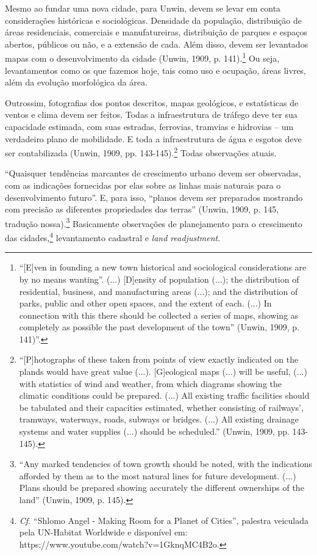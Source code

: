 \documentclass[12pt, a4paper]{book} %
\begin{document}
        Mesmo ao fundar uma nova cidade, para Unwin, devem se levar em conta considerações históricas e sociológicas. Densidade da população, distribuição de áreas residenciais, comerciais e manufatureiras, distribuição de parques e espaços abertos, públicos ou não, e a extensão de cada. Além disso, devem ser levantados mapas com o desenvolvimento da cidade (Unwin, 1909, p. 141).\footnote[29]{``[E]ven in founding a new town historical and sociological considerations are by no means wanting''. (...) [D]ensity of population (...); the distribution of residential, business, and manufacturing areas (...); and the distribution of parks, public and other open spaces, and the extent of each. (...) In connection with this there should be collected a series of maps, showing as completely as possible the past development of the town'' (Unwin, 1909, p. 141)''.} Ou seja, levantamentos como os que fazemos hoje, tais como uso e ocupação, áreas livres, além da evolução morfológica da área.

        Outrossim, fotografias dos pontos descritos, mapas geológicos, e estatísticas de ventos e clima devem ser feitos. Todas a infraestrutura de tráfego deve ter sua capacidade estimada, com suas estradas, ferrovias, tramvias e hidrovias – um verdadeiro plano de mobilidade. E toda a infraestrutura de água e esgotos deve ser contabilizada (Unwin, 1909, pp. 143-145).\footnote[30]{``[P]hotographs of these taken from points of view exactly indicated on the plands would have great value (...). [G]eological maps (...) will be useful, (...) with statistics of wind and weather, from which diagrams showing the climatic conditions could be prepared. (...) All existing traffic facilities should be tabulated and their capacities estimated, whether consisting of railways', tramways, waterways, roads, subways or bridges. (...) All existing drainage systems and water supplies (...) should be scheduled.'' (Unwin, 1909, pp. 143-145).} Todas observações atuais.

        ``Quaisquer tendências marcantes de crescimento urbano devem ser observadas, com as indicações fornecidas por elas sobre as linhas mais naturais para o desenvolvimento futuro''. E, para isso, ``planos devem ser preparados mostrando com precisão as diferentes propriedades das terras'' (Unwin, 1909, p. 145, tradução nossa).\footnote[31]{``Any marked tendencies of town growth should be noted, with the indications afforded by them as to the most natural lines for future development. (...) Plans should be prepared showing accurately the different ownerships of the land'' (Unwin, 1909, p. 145).} Basicamente observações de planejamento para o crescimento das cidades,\footnote[32]{\textit{Cf.} ``Shlomo Angel - Making Room for a Planet of Cities'', palestra veiculada pela UN-Habitat Worldwide e disponível em: https://www.youtube.com/watch?v=1GknqMC4B2o.} levantamento cadastral e \textit{land readjustment}.
\end{document}
